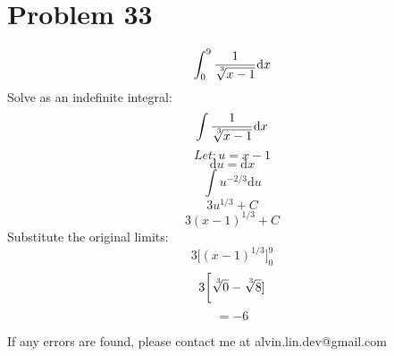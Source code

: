 \documentclass[letterpaper, 12pt]{article}
\newcommand*{\diff}{\mathrm{d}}
\newcommand*{\nthroot}[2]{\sqrt[\leftroot{-2}\uproot{3}#1]{#2}}
\begin{document}
\section*{Problem 33}
\[ \int_{0}^{9}{\frac{1}{\nthroot{3}{x-1}}\diff{x}} \]
Solve as an indefinite integral:
\[ \int{\frac{1}{\nthroot{3}{x-1}}\diff{x}} \]
\[ Let: u = x-1 \]
\[ \diff{u} = \diff{x} \]
\[ \int{u^{-2/3}\diff{u}} \]
\[ 3u^{1/3}+C \]
\[ 3(x-1)^{1/3}+C \]
Substitute the original limits:
\[ 3\bigg[(x-1)^{1/3}\bigg]_{0}^{9} \]
\[ 3\bigg[\nthroot{3}{0}-\nthroot{3}{8}] \]
\[ = -6 \]

\begin{center}
  If any errors are found, please contact me at alvin.lin.dev@gmail.com
\end{center}
\end{document}
